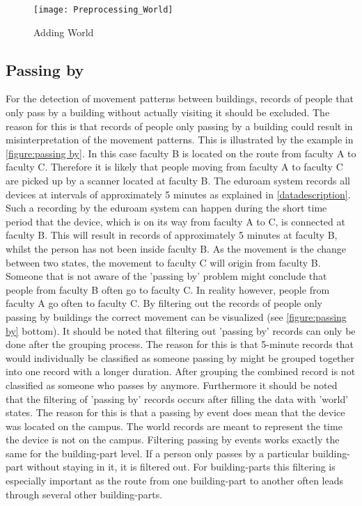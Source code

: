 \begin{figure}[H]
\centering
\texttt{[image: Preprocessing\_World]}
\captionsetup{justification=centering}
\caption{Adding World}
\label{figure:world}
\end{figure}

\subsection{Passing by}\label{passingBy}
For the detection of movement patterns between buildings, records of people that only pass by a building without actually visiting it should be excluded. The reason for this is that records of people only passing by a building could result in misinterpretation of the movement patterns. This is illustrated by the example in \autoref{figure:passing by}. In this case faculty B is located on the route from faculty A to faculty C. Therefore it is likely that people moving from faculty A to faculty C are picked up by a scanner located at faculty B. The eduroam system records all devices at intervals of approximately 5 minutes as explained in \autoref{datadescription}. Such a recording by the eduroam system can happen during the short time period that the device, which is on its way from faculty A to C, is connected at faculty B. This will result in records of approximately 5 minutes at faculty B, whilst the person has not been inside faculty B. As the movement is the change between two states, the movement to faculty C will origin from faculty B. Someone that is not aware of the 'passing by' problem might conclude that people from faculty B often go to faculty C. In reality however, people from faculty A go often to faculty C. By filtering out the records of people only passing by buildings the correct movement can be visualized (see \autoref{figure:passing by} bottom). It should be noted that filtering out 'passing by' records can only be done after the grouping process. The reason for this is that 5-minute records that would individually be classified as someone passing by might be grouped together into one record with a longer duration. After grouping the combined record is not classified as someone who passes by anymore. Furthermore it should be noted that the filtering of 'passing by' records occurs after filling the data with 'world' states. The reason for this is that a passing by event does mean that the device was located on the campus. The world records are meant to represent the time the device is not on the campus. Filtering passing by events works exactly the same for the building-part level. If a person only passes by a particular building-part without staying in it, it is filtered out. For building-parts this filtering is especially important as the route from one building-part to another often leads through several other building-parts. 

